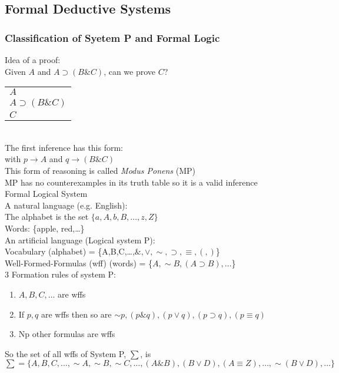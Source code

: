 \subsection{Formal Deductive Systems}

\subsubsection{Classification of Syetem P and Formal Logic}

Idea of a proof:\\
Given $A$ and $A\supset(B\& C)$, can we prove $C$?\\
\begin{tabular}{p{3cm}}
    $A$\\
    $A\supset(B\& C)$\\
    \hline
    $C$
\end{tabular}\\
The first inference has this form:\\
 with $p\to A$ and $q\to(B\&C)$\\
This form of reasoning is called \textit{Modus Ponens} (MP)\\
MP has no counterexamples in its truth table so it is a valid inference\\

Formal Logical System\\
A natural language (e.g. English):\\
The alphabet is the set $\{a,A,b,B,\ldots,z,Z\}$\\
Words: \{apple, red,\ldots\}\\
An artificial language (Logical system P):\\
Vocabulary (alphabet) = \{A,B,C,\ldots,$\&,\vee,\sim,\supset,\equiv,(,)$\}\\
Well-Formed-Formulas (wff) (words) = \{$A,\sim B,(A\supset B),\ldots$\}\\

3 Formation rules of system P:
\begin{enumerate}
    \item $A,B,C,\ldots$ are wffs
    \item If $p,q$ are wffs then so are $\sim p,(p\& q),(p\vee q),(p\supset q),(p\equiv q)$
    \item Np other formulas are wffs
\end{enumerate}
So the set of all wffs of System P, $\sum$, is\\
$\sum=\{A,B,C,\ldots,\sim A,\sim B,\sim C,\ldots,(A\& B),(B\vee D),(A\equiv Z),\ldots,\sim(B\vee D),\ldots\}$\\

